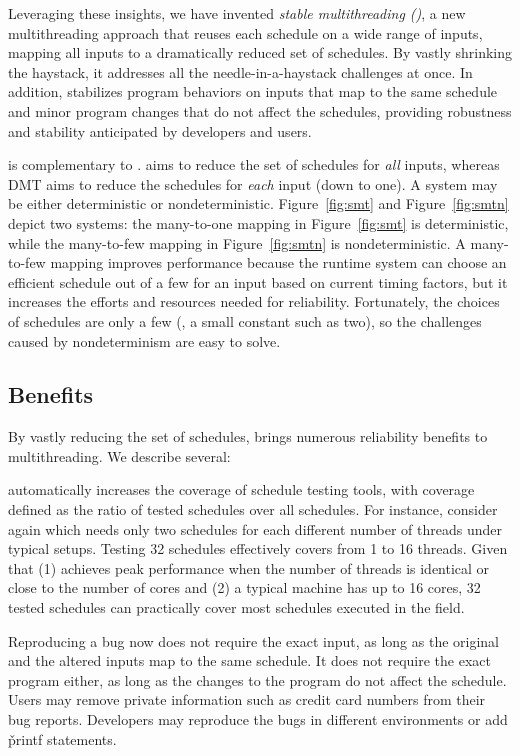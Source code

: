 Leveraging these insights, we have invented \emph{stable multithreading
  (\smt)}, a new multithreading approach that reuses each schedule on a wide
range of inputs, mapping all inputs to a dramatically reduced set of schedules.
By vastly shrinking the haystack, it addresses all the needle-in-a-haystack
challenges at once.  In addition, \smt stabilizes program behaviors
on inputs that map to the same schedule and minor program changes that
do not affect the schedules, providing robustness and stability
anticipated by developers and users.

\smt is complementary to \dmt. \smt aims to reduce the set of schedules for
\emph{all} inputs, whereas DMT aims to reduce the schedules for \emph{each}
input (down to one).  A \smt system may be either deterministic or
nondeterministic. Figure~\ref{fig:smt} and Figure~\ref{fig:smtn} depict two \smt
systems: the many-to-one mapping in Figure~\ref{fig:smt} is deterministic, while
the many-to-few mapping in Figure~\ref{fig:smtn} is nondeterministic.  A
many-to-few mapping improves performance because the runtime system can choose
an efficient schedule out of a few for an input based on current timing factors,
but it increases the efforts and resources needed for reliability.  Fortunately,
the choices of schedules are only a few (\eg, a small constant such as two), so
the challenges caused by nondeterminism are easy to solve.

\subsection{Benefits}

By vastly reducing the set of schedules, \smt brings numerous reliability
benefits to multithreading.  We describe several:

 \smt automatically
increases the coverage of schedule testing tools, with coverage
defined as the ratio of tested schedules over all schedules.
For instance, consider \pbzip again which needs only two
schedules for each different number of threads under typical setups.  Testing 32
schedules effectively covers from 1 to 16 threads.  Given that (1) \pbzip
achieves peak performance when the number of threads is identical or close to
the number of cores and (2) a typical machine has up to 16 cores, 32 tested
schedules can practically cover most schedules executed in the field.

 Reproducing a bug now does not require the exact input,
as long as the original and the altered inputs map to the same schedule.
It does not require the exact program either, as long as the changes to
the program do not affect the schedule.  Users may remove private
information such as credit card numbers from their bug reports. Developers
may reproduce the bugs in different environments or add \v{printf}
statements.

